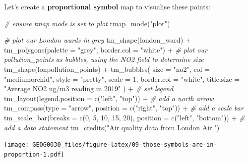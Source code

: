 \documentclass[
]{book}
\newenvironment{Shaded}{\begin{snugshade}}{\end{snugshade}}
\newcommand{\AttributeTok}[1]{\textcolor[rgb]{0.77,0.63,0.00}{#1}}
\newcommand{\CommentTok}[1]{\textcolor[rgb]{0.56,0.35,0.01}{\textit{#1}}}
\newcommand{\DecValTok}[1]{\textcolor[rgb]{0.00,0.00,0.81}{#1}}
\newcommand{\FunctionTok}[1]{\textcolor[rgb]{0.00,0.00,0.00}{#1}}
\newcommand{\NormalTok}[1]{#1}
\newcommand{\SpecialCharTok}[1]{\textcolor[rgb]{0.00,0.00,0.00}{#1}}
\newcommand{\StringTok}[1]{\textcolor[rgb]{0.31,0.60,0.02}{#1}}
\begin{document}
Let's create a \textbf{proportional symbol} map to visualise these points:

\begin{Shaded}
\begin{Highlighting}[]
\CommentTok{\# ensure tmap mode is set to plot}
\FunctionTok{tmap\_mode}\NormalTok{(}\StringTok{"plot"}\NormalTok{)}

\CommentTok{\# plot our London wards in grey}
\FunctionTok{tm\_shape}\NormalTok{(london\_ward) }\SpecialCharTok{+}
  \FunctionTok{tm\_polygons}\NormalTok{(}\AttributeTok{palette =} \StringTok{"grey"}\NormalTok{, }\AttributeTok{border.col =} \StringTok{"white"}\NormalTok{) }\SpecialCharTok{+}
  \CommentTok{\# plot our pollution\_points as bubbles, using the NO2 field to determine size}
  \FunctionTok{tm\_shape}\NormalTok{(lonpollution\_points) }\SpecialCharTok{+}
  \FunctionTok{tm\_bubbles}\NormalTok{(}
    \AttributeTok{size =} \StringTok{"no2"}\NormalTok{, }\AttributeTok{col =} \StringTok{"mediumorchid"}\NormalTok{, }\AttributeTok{style =} \StringTok{"pretty"}\NormalTok{,}
    \AttributeTok{scale =} \DecValTok{1}\NormalTok{, }\AttributeTok{border.col =} \StringTok{"white"}\NormalTok{,}
    \AttributeTok{title.size =} \StringTok{"Average NO2 ug/m3 reading in 2019"}
\NormalTok{  ) }\SpecialCharTok{+}
  \CommentTok{\# set legend}
  \FunctionTok{tm\_layout}\NormalTok{(}\AttributeTok{legend.position =} \FunctionTok{c}\NormalTok{(}\StringTok{"left"}\NormalTok{, }\StringTok{"top"}\NormalTok{)) }\SpecialCharTok{+}
  \CommentTok{\# add a north arrow}
  \FunctionTok{tm\_compass}\NormalTok{(}\AttributeTok{type =} \StringTok{"arrow"}\NormalTok{, }\AttributeTok{position =} \FunctionTok{c}\NormalTok{(}\StringTok{"right"}\NormalTok{, }\StringTok{"top"}\NormalTok{)) }\SpecialCharTok{+}
  \CommentTok{\# add a scale bar}
  \FunctionTok{tm\_scale\_bar}\NormalTok{(}\AttributeTok{breaks =} \FunctionTok{c}\NormalTok{(}\DecValTok{0}\NormalTok{, }\DecValTok{5}\NormalTok{, }\DecValTok{10}\NormalTok{, }\DecValTok{15}\NormalTok{, }\DecValTok{20}\NormalTok{), }\AttributeTok{position =} \FunctionTok{c}\NormalTok{(}\StringTok{"left"}\NormalTok{, }\StringTok{"bottom"}\NormalTok{)) }\SpecialCharTok{+}
  \CommentTok{\# add a data statement}
  \FunctionTok{tm\_credits}\NormalTok{(}\StringTok{"Air quality data from London Air."}\NormalTok{)}
\end{Highlighting}
\end{Shaded}

\texttt{[image: GEOG0030\_files/figure-latex/09-those-symbols-are-in-proportion-1.pdf]}
\end{document}

